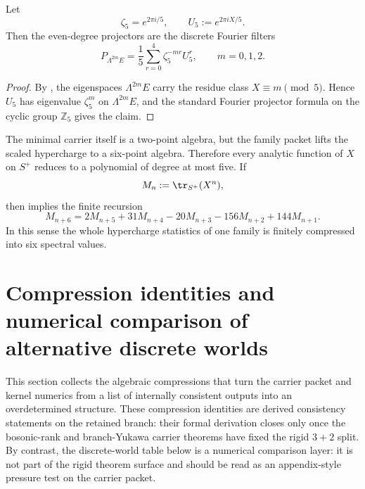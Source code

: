 \begin{corollary}
\label{cor:family-degree-filters}
Let
\[
\zeta_5=e^{2\pi i/5},
\qquad
U_5:=e^{2\pi iX/5}.
\]
Then the even-degree projectors are the discrete Fourier filters
\[
P_{\Lambda^{2m}E}
=
\frac15\sum_{r=0}^{4}\zeta_5^{-mr}U_5^r,
\qquad
m=0,1,2.
\]
\end{corollary}

\begin{proof}
By , the eigenspaces $\Lambda^{2m}E$ carry the residue class $X\equiv m\pmod 5$. Hence $U_5$ has eigenvalue $\zeta_5^m$ on $\Lambda^{2m}E$, and the standard Fourier projector formula on the cyclic group $\mathbb Z_5$ gives the claim.
\end{proof}

\begin{remark}
The minimal carrier itself is a two-point algebra, but the family packet lifts the scaled hypercharge to a six-point algebra. Therefore every analytic function of $X$ on $S^+$ reduces to a polynomial of degree at most five. If
\[
M_n:=\tr_{S^+}(X^n),
\]
then  implies the finite recursion
\[
M_{n+6}
=
2M_{n+5}+31M_{n+4}-20M_{n+3}-156M_{n+2}+144M_{n+1}.
\]
In this sense the whole hypercharge statistics of one family is finitely compressed into six spectral values.
\end{remark}


\section{Compression identities and numerical comparison of alternative discrete worlds}

This section collects the algebraic compressions that turn the carrier packet and kernel numerics
from a list of internally consistent outputs into an overdetermined structure. These compression
identities are derived consistency statements on the retained branch: their formal derivation closes
only once the bosonic-rank and branch-Yukawa carrier theorems have fixed the rigid $3+2$ split. By
contrast, the discrete-world table below is a numerical comparison layer: it is not part of the
rigid theorem surface and should be read as an appendix-style pressure test on the carrier packet.

